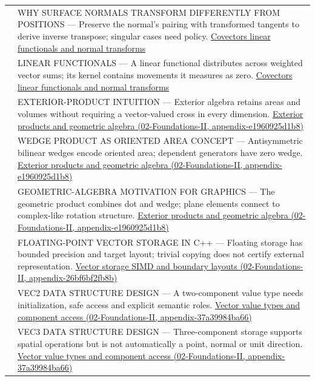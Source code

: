{\begin{longtable}[]{@{}
  >{\raggedright\arraybackslash}p{}
  >{\raggedright\arraybackslash}p{}@{}}
582 & WHY SURFACE NORMALS TRANSFORM DIFFERENTLY FROM POSITIONS --- Preserve the normal's pairing with transformed tangents to derive inverse transpose; singular cases need policy. \hyperref[appendix-46da295c6787]{Covectors linear functionals and normal transforms} \\
583 & LINEAR FUNCTIONALS --- A linear functional distributes across weighted vector sums; its kernel contains movements it measures as zero. \hyperref[appendix-46da295c6787]{Covectors linear functionals and normal transforms} \\
584 & EXTERIOR-PRODUCT INTUITION --- Exterior algebra retains areas and volumes without requiring a vector-valued cross in every dimension. \href{../02-Foundations-II/main.pdf\#nameddest=appendix-e1960925d1b8}{Exterior products and geometric algebra (02-Foundations-II, appendix-e1960925d1b8)} \\
585 & WEDGE PRODUCT AS ORIENTED AREA CONCEPT --- Antisymmetric bilinear wedges encode oriented area; dependent generators have zero wedge. \href{../02-Foundations-II/main.pdf\#nameddest=appendix-e1960925d1b8}{Exterior products and geometric algebra (02-Foundations-II, appendix-e1960925d1b8)} \\
586 & GEOMETRIC-ALGEBRA MOTIVATION FOR GRAPHICS --- The geometric product combines dot and wedge; plane elements connect to complex-like rotation structure. \href{../02-Foundations-II/main.pdf\#nameddest=appendix-e1960925d1b8}{Exterior products and geometric algebra (02-Foundations-II, appendix-e1960925d1b8)} \\
587 & FLOATING-POINT VECTOR STORAGE IN C++ --- Floating storage has bounded precision and target layout; trivial copying does not certify external representation. \href{../02-Foundations-II/main.pdf\#nameddest=appendix-26bf6bf2fb8b}{Vector storage SIMD and boundary layouts (02-Foundations-II, appendix-26bf6bf2fb8b)} \\
588 & VEC2 DATA STRUCTURE DESIGN --- A two-component value type needs initialization, safe access and explicit semantic roles. \href{../02-Foundations-II/main.pdf\#nameddest=appendix-37a39984ba66}{Vector value types and component access (02-Foundations-II, appendix-37a39984ba66)} \\
589 & VEC3 DATA STRUCTURE DESIGN --- Three-component storage supports spatial operations but is not automatically a point, normal or unit direction. \href{../02-Foundations-II/main.pdf\#nameddest=appendix-37a39984ba66}{Vector value types and component access (02-Foundations-II, appendix-37a39984ba66)} \\

\end{longtable}}
